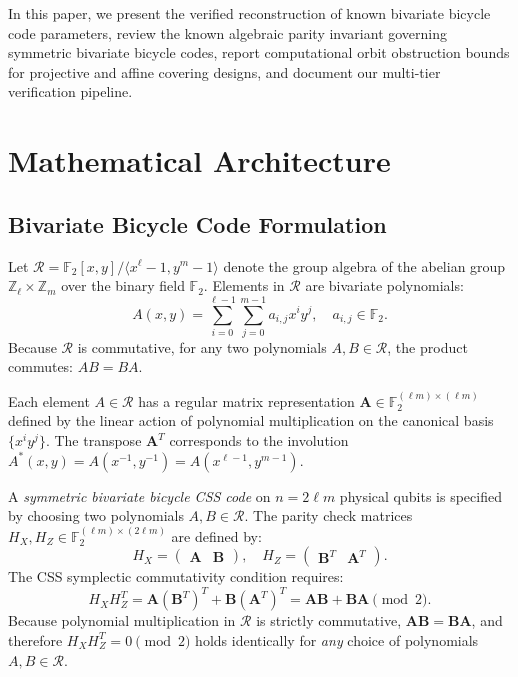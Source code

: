 \documentclass[11pt,a4paper]{article}
\begin{document}
In this paper, we present the verified reconstruction of known bivariate bicycle code parameters, review the known algebraic parity invariant governing symmetric bivariate bicycle codes, report computational orbit obstruction bounds for projective and affine covering designs, and document our multi-tier verification pipeline.

\section{Mathematical Architecture}
\label{sec:architecture}

\subsection{Bivariate Bicycle Code Formulation}
\label{sec:bivariate_formulation}
Let $\mathcal{R} = \mathbb{F}_2[x, y] / \langle x^\ell - 1, y^m - 1 \rangle$ denote the group algebra of the abelian group $\mathbb{Z}_\ell \times \mathbb{Z}_m$ over the binary field $\mathbb{F}_2$. Elements in $\mathcal{R}$ are bivariate polynomials:
\begin{equation}
\label{eq:poly}
A(x, y) = \sum_{i=0}^{\ell-1} \sum_{j=0}^{m-1} a_{i, j} x^i y^j, \quad a_{i, j} \in \mathbb{F}_2.
\end{equation}
Because $\mathcal{R}$ is commutative, for any two polynomials $A, B \in \mathcal{R}$, the product commutes: $A B = B A$.

Each element $A \in \mathcal{R}$ has a regular matrix representation $\mathbf{A} \in \mathbb{F}_2^{(\ell m) \times (\ell m)}$ defined by the linear action of polynomial multiplication on the canonical basis $\{x^i y^j\}$. The transpose $\mathbf{A}^T$ corresponds to the involution $A^*(x, y) = A(x^{-1}, y^{-1}) = A(x^{\ell-1}, y^{m-1})$.

A \emph{symmetric bivariate bicycle CSS code} on $n = 2\ell m$ physical qubits is specified by choosing two polynomials $A, B \in \mathcal{R}$. The parity check matrices $H_X, H_Z \in \mathbb{F}_2^{(\ell m) \times (2\ell m)}$ are defined by:
\begin{equation}
\label{eq:bivariate_hx_hz}
H_X = \begin{pmatrix} \mathbf{A} & \mathbf{B} \end{pmatrix}, \quad H_Z = \begin{pmatrix} \mathbf{B}^T & \mathbf{A}^T \end{pmatrix}.
\end{equation}
The CSS symplectic commutativity condition requires:
\begin{equation}
\label{eq:bivariate_comm}
H_X H_Z^T = \mathbf{A} (\mathbf{B}^T)^T + \mathbf{B} (\mathbf{A}^T)^T = \mathbf{A} \mathbf{B} + \mathbf{B} \mathbf{A} \pmod 2.
\end{equation}
Because polynomial multiplication in $\mathcal{R}$ is strictly commutative, $\mathbf{A} \mathbf{B} = \mathbf{B} \mathbf{A}$, and therefore $H_X H_Z^T = 0 \pmod 2$ holds identically for \emph{any} choice of polynomials $A, B \in \mathcal{R}$.
\end{document}
